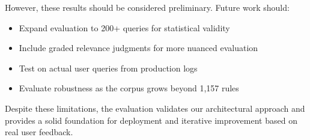However, these results should be considered preliminary. Future work should:
\begin{itemize}[leftmargin=*,itemsep=2pt,topsep=2pt]
  \item Expand evaluation to 200+ queries for statistical validity
  \item Include graded relevance judgments for more nuanced evaluation
  \item Test on actual user queries from production logs
  \item Evaluate robustness as the corpus grows beyond 1,157 rules
\end{itemize}

Despite these limitations, the evaluation validates our architectural approach and provides a solid foundation for deployment and iterative improvement based on real user feedback.
